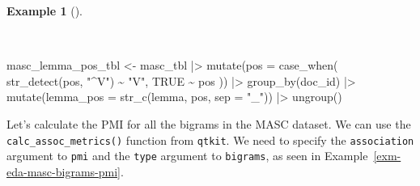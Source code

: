 \documentclass[
  letterpaper,
]{latex/krantz}
\newenvironment{Shaded}{\begin{snugshade}}{\end{snugshade}}
\newcommand{\AttributeTok}[1]{\textcolor[rgb]{0.00,0.00,0.00}{#1}}
\newcommand{\ConstantTok}[1]{\textcolor[rgb]{0.00,0.00,0.00}{#1}}
\newcommand{\FunctionTok}[1]{\textcolor[rgb]{0.00,0.00,0.00}{#1}}
\newcommand{\NormalTok}[1]{\textcolor[rgb]{0.00,0.00,0.00}{#1}}
\newcommand{\OtherTok}[1]{\textcolor[rgb]{0.00,0.00,0.00}{#1}}
\newcommand{\SpecialCharTok}[1]{\textcolor[rgb]{0.00,0.00,0.00}{#1}}
\newcommand{\StringTok}[1]{\textcolor[rgb]{0.00,0.00,0.00}{#1}}
\theoremstyle{definition}
\newtheorem{example}{Example}[chapter]
\theoremstyle{remark}
\begin{document}
\begin{example}[]\protect\hypertarget{exm-eda-masc-lemma-pos}{}\label{exm-eda-masc-lemma-pos}

~

\begin{Shaded}
\begin{Highlighting}[]
\NormalTok{masc\_lemma\_pos\_tbl }\OtherTok{\textless{}{-}}
\NormalTok{  masc\_tbl }\SpecialCharTok{|\textgreater{}}
  \FunctionTok{mutate}\NormalTok{(}\AttributeTok{pos =} \FunctionTok{case\_when}\NormalTok{(}
    \FunctionTok{str\_detect}\NormalTok{(pos, }\StringTok{"\^{}V"}\NormalTok{) }\SpecialCharTok{\textasciitilde{}} \StringTok{"V"}\NormalTok{,}
    \ConstantTok{TRUE} \SpecialCharTok{\textasciitilde{}}\NormalTok{ pos}
\NormalTok{  )) }\SpecialCharTok{|\textgreater{}}
  \FunctionTok{group\_by}\NormalTok{(doc\_id) }\SpecialCharTok{|\textgreater{}}
  \FunctionTok{mutate}\NormalTok{(}\AttributeTok{lemma\_pos =} \FunctionTok{str\_c}\NormalTok{(lemma, pos, }\AttributeTok{sep =} \StringTok{"\_"}\NormalTok{)) }\SpecialCharTok{|\textgreater{}}
  \FunctionTok{ungroup}\NormalTok{()}
\end{Highlighting}
\end{Shaded}

\end{example}

Let's calculate the PMI for all the bigrams in the MASC dataset. We can
use the \texttt{calc\_assoc\_metrics()} function from \texttt{qtkit}. We
need to specify the \texttt{association} argument to \texttt{pmi} and
the \texttt{type} argument to \texttt{bigrams}, as seen in
Example~\ref{exm-eda-masc-bigrams-pmi}.
\end{document}
